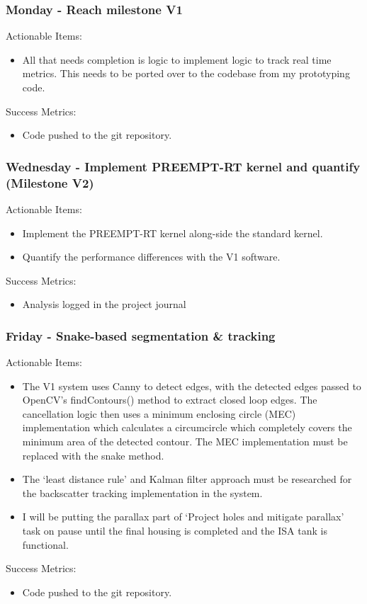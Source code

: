 \subsubsection{Monday - Reach milestone V1}

Actionable Items:

\begin{itemize}
    \item All that needs completion is logic to implement logic to track real time metrics. This needs to be ported over to the codebase from my prototyping code.
\end{itemize}

Success Metrics:

\begin{itemize}
    \item Code pushed to the git repository.
\end{itemize}




\subsubsection{Wednesday - Implement PREEMPT-RT kernel and quantify (Milestone V2)}

Actionable Items:

\begin{itemize}
    \item Implement the PREEMPT-RT kernel along-side the standard kernel.
    \item Quantify the performance differences with the V1 software.
\end{itemize}

Success Metrics:

\begin{itemize}
    \item Analysis logged in the project journal
\end{itemize}






\subsubsection{Friday - Snake-based segmentation \& tracking}

Actionable Items:

\begin{itemize}
    \item The V1 system uses Canny to detect edges, with the detected edges passed to OpenCV's findContours() method to extract closed loop edges. The cancellation logic then uses a minimum enclosing circle (MEC) implementation which calculates a circumcircle which completely covers the minimum area of the detected contour. The MEC implementation must be replaced with the snake method.
    \item The `least distance rule' and Kalman filter approach must be researched for the backscatter tracking implementation in the system.
    \item I will be putting the parallax part of `Project holes and mitigate parallax' task on pause until the final housing is completed and the ISA tank is functional.
\end{itemize}

Success Metrics:

\begin{itemize}
    \item Code pushed to the git repository.
\end{itemize}

